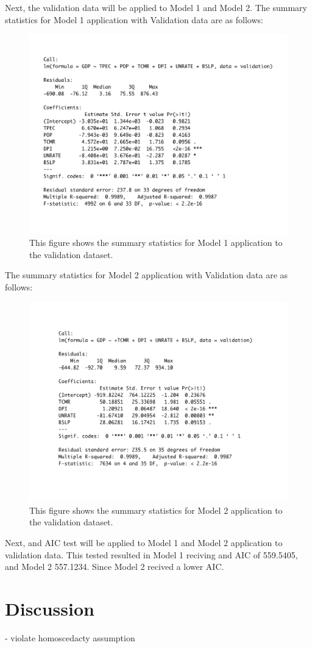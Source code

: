 \documentclass[12pt]{article}
\begin{document}
Next, the validation data will be applied to Model 1 and Model 2. 
The summary statistics for Model 1 application with Validation data are as follows: 
\begin{figure}[H]
  \centering
  \includegraphics[scale = .35]{mod1v}
  \caption{This figure shows the summary statistics for Model 1 application to the validation dataset.}
\end{figure}
The summary statistics for Model 2 application with Validation data are as follows: 
\begin{figure}[H]
  \centering
  \includegraphics[scale = .35]{mod2v}
  \caption{This figure shows the summary statistics for Model 2 application to the validation dataset.}
\end{figure}

Next, and AIC test will be applied to Model 1 and Model 2 application to validation data. 
This tested resulted in Model 1 reciving and AIC of 559.5405, and Model 2 557.1234. 
Since Model 2 recived a lower AIC. 



\section*{Discussion}


- violate homoscedacty assumption



\end{document}

